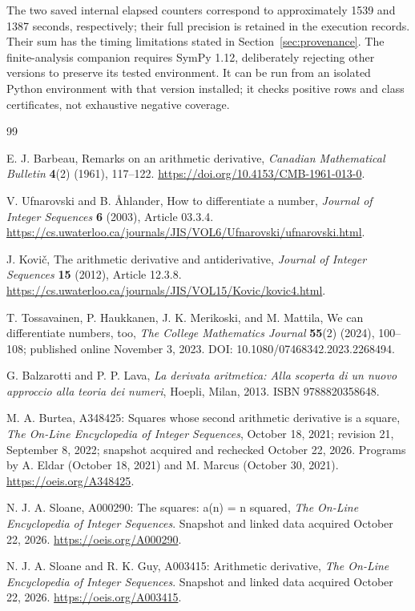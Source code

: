\documentclass[11pt]{article}
\theoremstyle{definition}
\theoremstyle{remark}
\begin{document}
The two saved internal elapsed counters correspond to approximately
1539 and 1387 seconds, respectively; their full precision is retained
in the execution records.
Their sum has the timing limitations stated in Section~\ref{sec:provenance}.
The finite-analysis companion requires SymPy 1.12, deliberately rejecting
other versions to preserve its tested environment. It can be run from an
isolated Python environment with that version installed; it checks positive
rows and class certificates, not exhaustive negative coverage.

\clearpage
\begin{thebibliography}{99}
\sloppy\raggedright
{}
E. J. Barbeau, Remarks on an arithmetic derivative,
\textit{Canadian Mathematical Bulletin} \textbf{4}(2) (1961), 117--122.
\url{https://doi.org/10.4153/CMB-1961-013-0}.

V. Ufnarovski and B. \AA hlander, How to differentiate a number,
\textit{Journal of Integer Sequences} \textbf{6} (2003), Article 03.3.4.
\url{https://cs.uwaterloo.ca/journals/JIS/VOL6/Ufnarovski/ufnarovski.html}.

J. Kovi\v{c}, The arithmetic derivative and antiderivative,
\textit{Journal of Integer Sequences} \textbf{15} (2012), Article 12.3.8.
\url{https://cs.uwaterloo.ca/journals/JIS/VOL15/Kovic/kovic4.html}.

T. Tossavainen, P. Haukkanen, J. K. Merikoski, and M. Mattila,
We can differentiate numbers, too,
\textit{The College Mathematics Journal} \textbf{55}(2) (2024), 100--108;
published online November 3, 2023. DOI: 10.1080/07468342.2023.2268494.


G. Balzarotti and P. P. Lava, \textit{La derivata aritmetica:
Alla scoperta di un nuovo approccio alla teoria dei numeri},
Hoepli, Milan, 2013. ISBN 9788820358648.

M. A. Burtea, A348425: Squares whose second arithmetic derivative is a
square, \textit{The On-Line Encyclopedia of Integer Sequences},
October 18, 2021; revision 21, September 8, 2022;
snapshot acquired and rechecked October 22, 2026.
Programs by A. Eldar (October 18, 2021) and M. Marcus (October 30, 2021).
\url{https://oeis.org/A348425}.

N. J. A. Sloane, A000290: The squares: a(n) = n squared,
\textit{The On-Line Encyclopedia of Integer Sequences}.
Snapshot and linked data acquired October 22, 2026.
\url{https://oeis.org/A000290}.

N. J. A. Sloane and R. K. Guy, A003415: Arithmetic derivative,
\textit{The On-Line Encyclopedia of Integer Sequences}.
Snapshot and linked data acquired October 22, 2026.
\url{https://oeis.org/A003415}.


\end{thebibliography}
\end{document}
